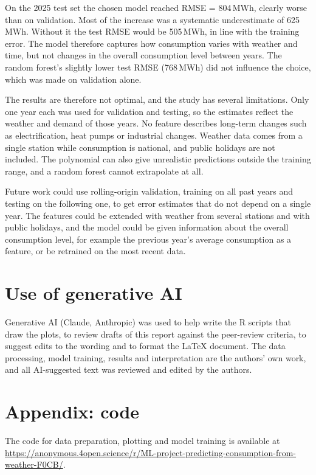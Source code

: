 \documentclass[10pt,a4paper]{article}
\begin{document}
On the 2025 test set the chosen model reached RMSE = 804\,MWh, clearly worse than on
validation. Most of the increase was a systematic underestimate of 625\,MWh. Without it the
test RMSE would be 505\,MWh, in line with the training error. The model therefore captures
how consumption varies with weather and time, but not changes in the overall consumption
level between years. The random forest's slightly lower test RMSE (768\,MWh) did not
influence the choice, which was made on validation alone.

The results are therefore not optimal, and the study has several limitations. Only one year
each was used for validation and testing, so the estimates reflect the weather and demand of
those years. No feature describes long-term changes such as electrification, heat pumps or
industrial changes. Weather data comes from a single station while consumption is national,
and public holidays are not included. The polynomial can also give unrealistic predictions
outside the training range, and a random forest cannot extrapolate at all.

Future work could use rolling-origin validation, training on all past years and testing on
the following one, to get error estimates that do not depend on a single year. The features
could be extended with weather from several stations and with public holidays, and the model
could be given information about the overall consumption level, for example the previous
year's average consumption as a feature, or be retrained on the most recent data.

\section*{Use of generative AI}

Generative AI (Claude, Anthropic) was used to help write the R scripts that draw the plots,
to review drafts of this report against the peer-review criteria, to suggest edits to the
wording and to format the \LaTeX{} document. The data processing, model training, results and
interpretation are the authors' own work, and all AI-suggested text was reviewed and edited
by the authors.




\section{Appendix: code}

The code for data preparation, plotting and model training is available at
\url{https://anonymous.4open.science/r/ML-project-predicting-consumption-from-weather-F0CB/}.
\end{document}
